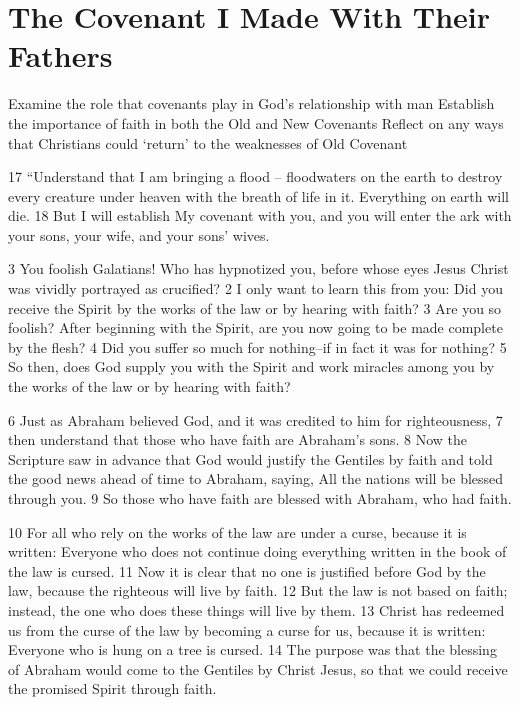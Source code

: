 \chapter{The Covenant I Made With Their Fathers}

\begin{goals}
\goal Examine the role that covenants play in God's relationship with man
\goal Establish the importance of faith in both the Old and New Covenants
\goal Reflect on any ways that Christians could `return' to the weaknesses of Old Covenant
\end{goals}

\begin{bible}


17 ``Understand that I am bringing a flood -- floodwaters on the earth to destroy every creature under heaven with the breath of life in it. Everything on earth will die.  18 But I will establish My covenant with you, and you will enter the ark with your sons, your wife, and your sons' wives. 

3 You foolish Galatians! Who has hypnotized you, before whose eyes Jesus Christ was vividly portrayed as crucified?  2 I only want to learn this from you: Did you receive the Spirit by the works of the law or by hearing with faith?  3 Are you so foolish? After beginning with the Spirit, are you now going to be made complete by the flesh?  4 Did you suffer so much for nothing--if in fact it was for nothing?  5 So then, does God supply you with the Spirit and work miracles among you by the works of the law or by hearing with faith?

6 Just as Abraham believed God, and it was credited to him for righteousness,  7 then understand that those who have faith are Abraham's sons.  8 Now the Scripture saw in advance that God would justify the Gentiles by faith and told the good news ahead of time to Abraham, saying, All the nations will be blessed through you.  9 So those who have faith are blessed with Abraham, who had faith.

10 For all who rely on the works of the law are under a curse, because it is written: Everyone who does not continue doing everything written in the book of the law is cursed.  11 Now it is clear that no one is justified before God by the law, because the righteous will live by faith.  12 But the law is not based on faith; instead, the one who does these things will live by them.  13 Christ has redeemed us from the curse of the law by becoming a curse for us, because it is written: Everyone who is hung on a tree is cursed.  14 The purpose was that the blessing of Abraham would come to the Gentiles by Christ Jesus, so that we could receive the promised Spirit through faith.


\end{bible}
